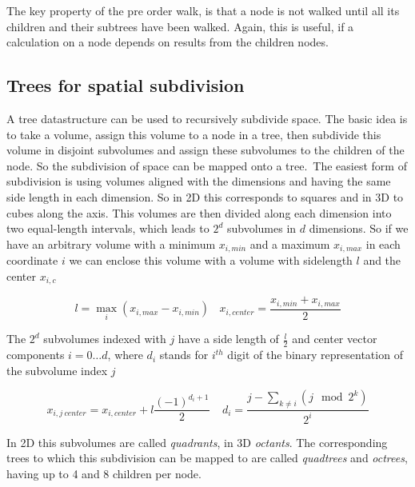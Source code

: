 The key property of the pre order walk, is that a node is not walked until all its children and their subtrees have been walked. Again, this is useful, if a calculation on a node depends on results from the children nodes.

\subsection{Trees for spatial subdivision}
A tree datastructure can be used to recursively subdivide space. The basic idea is to take a volume, assign this volume to a node in a tree, then subdivide this volume in disjoint subvolumes and assign these subvolumes to the children of the node. So the subdivision of space can be mapped onto a tree.\ The easiest form of subdivision is using volumes aligned with the dimensions and having the same side length in each dimension. So in 2D this corresponds to squares and in 3D to cubes along the axis. This volumes are then divided along each dimension into two equal-length intervals, which leads to $2^d$ subvolumes in $d$ dimensions. So if we have an arbitrary volume with a minimum $x_{i,min}$ and a maximum $x_{i,max}$ in each coordinate $i$ we can enclose this volume with a volume with sidelength $l$ and the center $x_{i,c}$

\begin{equation}
l = \max_{i} ( x_{i,max} - x_{i,min})  ~~~~ x_{i,center}= \frac{ x_{i,min} + x_{i,max} }{2}
\end{equation}

The $2^{d}$ subvolumes indexed with $j$ have a side length of $\frac{l}{2}$ and center vector components $i = 0 \dots d$, where $d_{i}$ stands for $i^{th}$ digit of the binary representation of the subvolume index $j$

\begin{equation}
x_{i, j~center} = x_{i,center} + l \frac{(-1)^{d_{i} + 1}}{2} ~~~~~ d_{i} = \frac{j  - \sum_{k \ne i} ( j \mod 2^{k} )}{2^{i}}
\end{equation}

In 2D this subvolumes are called \emph{quadrants}, in 3D \emph{octants}. The corresponding trees to which this subdivision can be mapped to are called \emph{quadtrees} and \emph{octrees}, having up to 4 and 8 children per node.


